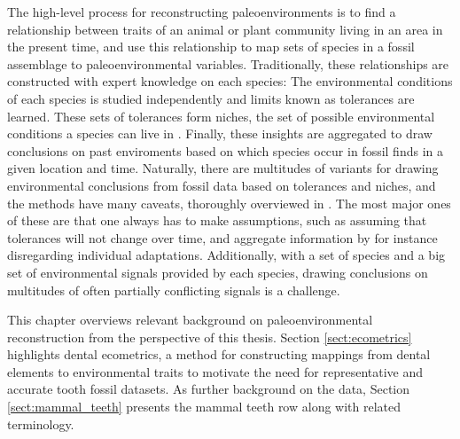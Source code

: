 \documentclass{article}
\begin{document}
The high-level process for reconstructing paleoenvironments is to find a relationship between traits of an 
animal or plant community living in an area in the present time, and use this 
relationship to map sets of species in a fossil assemblage to paleoenvironmental variables.
Traditionally, these relationships are constructed with expert knowledge on each species: The environmental conditions of
each species is studied independently and limits known as tolerances are learned. These sets of tolerances form niches,
the set of possible environmental conditions a species can live in \cite{Faith_Lyman_2019}. Finally, these insights are aggregated to 
draw conclusions on past enviroments based on which species occur in fossil finds in a given location and time.
Naturally, there are multitudes of variants for drawing environmental conclusions from fossil data based on 
tolerances and niches, and the methods have many caveats, thoroughly overviewed in \cite{Faith_Lyman_2019}. The most major ones of these are that one always has to 
make assumptions, such as assuming that tolerances will not change over time, and aggregate information by for instance 
disregarding individual adaptations. Additionally, with a set of species and a big set of environmental signals provided 
by each species, drawing conclusions on multitudes of often partially conflicting signals is a challenge.

This chapter overviews relevant background on paleoenvironmental reconstruction from the perspective of this thesis.
Section \ref{sect:ecometrics} highlights dental ecometrics, a method for constructing mappings from dental elements to environmental traits to motivate the 
need for representative and accurate tooth fossil datasets. As further background on the data, Section \ref{sect:mammal_teeth} presents the mammal teeth 
row along with related terminology.
\end{document}
